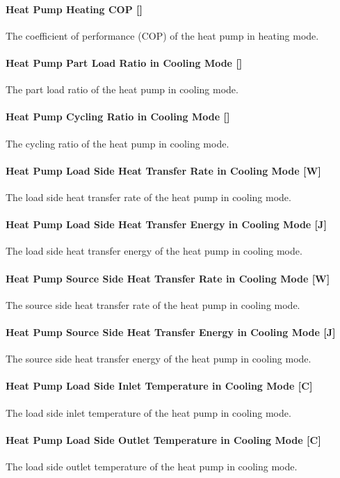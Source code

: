 \paragraph{Heat Pump Heating COP {[}{]}} The coefficient of performance (COP) of
the heat pump in heating mode.
\paragraph{Heat Pump Part Load Ratio in Cooling Mode {[}{]}} The part load ratio
of the heat pump in cooling mode.
\paragraph{Heat Pump Cycling Ratio in Cooling Mode {[}{]}} The cycling ratio of
the heat pump in cooling mode.
\paragraph{Heat Pump Load Side Heat Transfer Rate in Cooling Mode {[}W{]}} The
load side heat transfer rate of the heat pump in cooling mode.
\paragraph{Heat Pump Load Side Heat Transfer Energy in Cooling Mode {[}J{]}} The
load side heat transfer energy of the heat pump in cooling mode.
\paragraph{Heat Pump Source Side Heat Transfer Rate in Cooling Mode {[}W{]}} The
source side heat transfer rate of the heat pump in cooling mode.
\paragraph{Heat Pump Source Side Heat Transfer Energy in Cooling Mode {[}J{]}}
The source side heat transfer energy of the heat pump in cooling mode.
\paragraph{Heat Pump Load Side Inlet Temperature in Cooling Mode {[}C{]}} The
load side inlet temperature of the heat pump in cooling mode.
\paragraph{Heat Pump Load Side Outlet Temperature in Cooling Mode {[}C{]}} The
load side outlet temperature of the heat pump in cooling mode.
